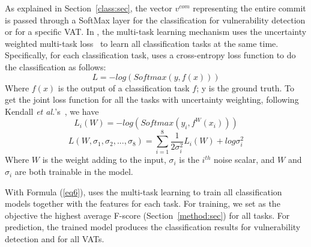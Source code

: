 As explained in Section~\ref{class:sec}, the vector $v^{com}$
representing the entire commit is passed through a SoftMax layer for
the classification for vulnerability detection or for a specific VAT.
In {\tool}, the multi-task learning mechanism uses the uncertainty
weighted multi-task loss~\cite{kendall2018multi} to learn all 
classification tasks at the same time. Specifically, for each
classification task, \tool uses a cross-entropy loss function to do
the classification as follows:
\begin{equation}\label{eq4}
	L = -log(Softmax(y, f(x)))
\end{equation}
Where $f(x)$ is the output of a classification task $f$; y is the
ground truth. To get the joint loss function for all the tasks with
uncertainty weighting, following Kendall {\em et
  al.}'s~\cite{kendall2018multi}, we have
\begin{equation}\label{eq5}
	L_i(W) = -log(Softmax(y_i, f^W(x_i)))
\end{equation}
\begin{equation}\label{eq6}
	L(W, \sigma_1, \sigma_2, ..., \sigma_8) = \sum_{i=1}^8\frac{1}{2\sigma_i^2}L_i(W) + log \sigma^2_i
\end{equation}
Where $W$ is the weight adding to the input, $\sigma_i$ is the
$i^{th}$ noise scalar, and $W$ and $\sigma_i$ are both trainable in
the model.

With Formula (\ref{eq6}), {\tool} uses the multi-task
learning to train all classification models together with the
features for each task. For training, we set as the objective the
highest average F-score (Section~\ref{method:sec}) for all 
tasks. For prediction, the trained model produces the
classification results for vulnerability detection and for all VATs.



